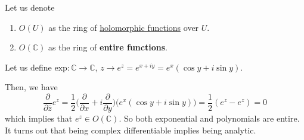 	\begin{definition}
	  \label{def:rings-of-holomorphic-and-entire-functions}
	  Let us denote 
		\begin{enumerate}
		  \item $O(U)$ as the ring of \hyperref[def:holomorphic-function-2]{holomorphic functions} over $U$. 
			\item $O(\mathbb{C})$ as the ring of \textbf{entire functions}. 
		\end{enumerate}
	\end{definition}

	\begin{definition}
	  \label{def:exponential-map}
		Let us define $\mathrm{exp}: \mathbb{C} \to \mathbb{C}$, $z \to e^z = e^{x + iy} = e^x (\cos{y} + i \sin{y})$.
	\end{definition}

	Then, we have 
	\begin{equation}
		\frac{\partial}{\partial \bar{z}} e^z = \frac{1}{2} \bigg( \frac{\partial}{\partial x} + i \frac{\partial}{\partial y} \bigg) \big( e^x (\cos{y} + i \sin{y}) \big) = \frac{1}{2} (e^z - e^z) = 0 
	\end{equation}
	which implies that $e^z \in O(\mathbb{C})$. So both exponential and polynomials are entire. It turns out that being complex differentiable implies being analytic. 

